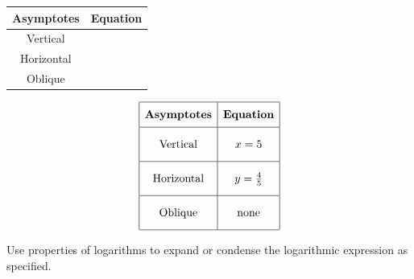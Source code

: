 \documentclass[11pt]{exam}
\begin{document}
\begin{questions}
\renewcommand{\arraystretch}{3}
	\begin{tabular}{|c|c|}
		\hline
		\textbf{Asymptotes}  & \textbf{Equation} \\ \hline
		Vertical   & \hspace{50mm}         \\ \hline
		Horizontal &          \\ \hline
		Oblique    &          \\ \hline
	\end{tabular}
\begin{solution}
\[\begin{array}{|c|c|} \hline \rule[-0.8em]{0pt}{2.2em} \textbf{Asymptotes} & \textbf{Equation} \\ \hline \rule[-1.2em]{0pt}{3em} \text{Vertical} & x = 5 \\ \hline \rule[-1.2em]{0pt}{3em} \text{Horizontal} & y = \frac{4}{5} \\ \hline \rule[-1.2em]{0pt}{3em} \text{Oblique} & \text{none} \\ \hline \end{array}\]
\end{solution}

\label{exact-endoce}
\newpage

\headerbox{\ocf}
\label{exact-startocf}

\question Use properties of logarithms to expand or condense the logarithmic expression as specified.
\end{questions}
\end{document}
